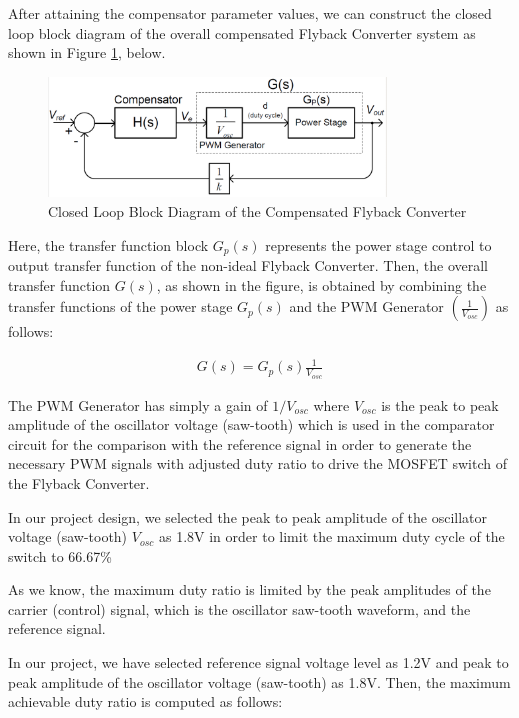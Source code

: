 After attaining the compensator parameter values, we can construct the closed loop block diagram of the overall compensated Flyback Converter system as shown in Figure \ref{com:CL_block}, below.

\begin{figure}[H]
\begin{center}
\includegraphics[width=0.8\textwidth]{Compensator/CL_block_diagram.png}
\caption{Closed Loop Block Diagram of the Compensated Flyback Converter}
\label{com:CL_block}
\end{center}
\end{figure}

Here, the transfer function block $G_p(s)$ represents the power stage control to output transfer function of the non-ideal Flyback Converter. Then, the overall transfer function $G(s)$, as shown in the figure, is obtained by combining the transfer functions of the power stage $G_p(s)$ and the PWM Generator $\left(\frac{1}{V_{osc}} \right)$ as follows:

\begin{align}
    G(s) = G_p(s)\frac{1}{V_{osc}}
\end{align}

The PWM Generator has simply a gain of $1/V_{osc}$ where $V_{osc}$ is the peak to peak amplitude of the oscillator voltage (saw-tooth) which is used in the comparator circuit for the comparison with the reference signal in order to generate the necessary PWM signals with adjusted duty ratio to drive the MOSFET switch of the Flyback Converter.

In our project design, we selected the peak to peak amplitude of the oscillator voltage (saw-tooth) $V_{osc}$ as 1.8V in order to limit the maximum duty cycle of the switch to 66.67\%

As we know, the maximum duty ratio is limited by the peak amplitudes of the carrier (control) signal, which is the oscillator saw-tooth waveform, and the reference signal.

In our project, we have selected reference signal voltage level as 1.2V and peak to peak amplitude of the oscillator voltage (saw-tooth) as 1.8V. Then, the maximum achievable duty ratio is computed as follows:

